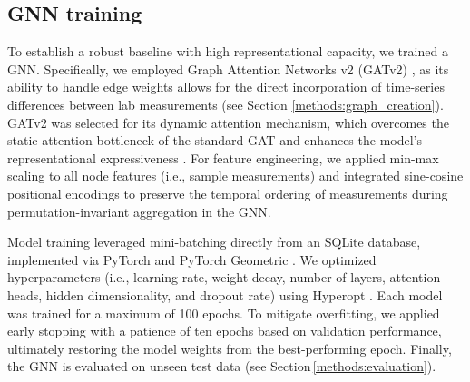 \documentclass[pdflatex,sn-mathphys-num,lineno]{sn-jnl}
\theoremstyle{thmstyleone}%
\theoremstyle{thmstyletwo}%
\theoremstyle{thmstylethree}%
\begin{document}
\subsection{GNN training}\label{methods:gnn}
To establish a robust baseline with high representational capacity, we trained a GNN. Specifically, we employed Graph Attention Networks v2 (GATv2) \cite{brody2022how}, as its ability to handle edge weights allows for the direct incorporation of time-series differences between lab measurements (see Section \ref{methods:graph_creation}). GATv2 was selected for its dynamic attention mechanism, which overcomes the static attention bottleneck of the standard GAT \cite{gat} and enhances the model's representational expressiveness \cite{brody2022how}. For feature engineering, we applied min-max scaling to all node features (i.e., sample measurements) and integrated sine-cosine positional encodings to preserve the temporal ordering of measurements during permutation-invariant aggregation in the GNN.

Model training leveraged mini-batching directly from an SQLite database, implemented via PyTorch \cite{PyTorch} and PyTorch Geometric \cite{Fey_Lenssen_2019,Fey_2025}. We optimized hyperparameters (i.e., learning rate, weight decay, number of layers, attention heads, hidden dimensionality, and dropout rate) using Hyperopt \cite{Bergstra2013}. Each model was trained for a maximum of 100 epochs. To mitigate overfitting, we applied early stopping with a patience of ten epochs based on validation performance, ultimately restoring the model weights from the best-performing epoch. Finally, the GNN is evaluated on unseen test data (see Section\,\ref{methods:evaluation}).
\end{document}
